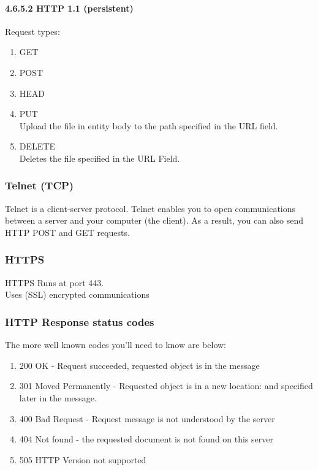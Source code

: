 \documentclass{article}
\begin{document}
\paragraph{4.6.5.2 HTTP 1.1 (persistent)}
Request types:
\begin{enumerate}
    \item GET
    \item POST
    \item HEAD
    \item PUT\\
    Upload the file in entity body to the path specified in the URL field.
    \item DELETE\\
    Deletes the file specified in the URL Field.
\end{enumerate}    
\subsubsection{Telnet (TCP)}
Telnet is a client-server protocol. Telnet enables you to open communications between a server and your computer (the client). As a result, you can also send HTTP POST and GET requests.
\subsubsection{HTTPS}
HTTPS Runs at port 443.\\
Uses (SSL) encrypted communications\\
\subsubsection{HTTP Response status codes}
The more well known codes you'll need to know are below:\\
\begin{enumerate}
    \item 200 OK - Request succeeded, requested object is in the message
    \item 301 Moved Permanently - Requested object is in a new location: and specified later in the message.
    \item 400 Bad Request - Request message is not understood by the server
    \item 404 Not found - the requested document is not found on this server
    \item 505 HTTP Version not supported
\end{enumerate}
\end{document}
